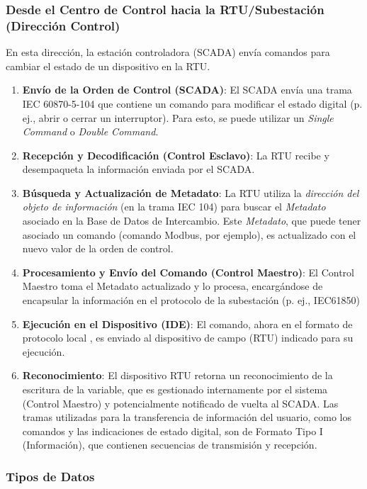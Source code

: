 \documentclass[a5paper]{book}%
\begin{document}
\subsubsection{Desde el Centro de Control hacia la RTU/Subestación (Dirección Control)}


En esta dirección, la estación controladora (SCADA) envía comandos para cambiar el estado de un dispositivo en la RTU.

\begin{enumerate}
\item \textbf{Envío de la Orden de Control (SCADA)}: El SCADA envía una trama IEC 60870-5-104 que contiene un comando para modificar el estado digital (p. ej., abrir o cerrar un interruptor). Para esto, se puede utilizar un \textit{Single Command} o \textit{Double Command}.
  
\item \textbf{Recepción y Decodificación (Control Esclavo)}: La RTU recibe y desempaqueta la información enviada por el SCADA.
  
\item \textbf {Búsqueda y Actualización de Metadato}: La RTU utiliza la \textit{dirección del objeto de información} (en la trama IEC 104) para buscar el \textit{Metadato} asociado en la Base de Datos de Intercambio. Este \textit{Metadato}, que puede tener asociado un comando (comando Modbus, por ejemplo), es actualizado con el nuevo valor de la orden de control.
  
\item \textbf {Procesamiento y Envío del Comando (Control Maestro)}: El Control Maestro toma el Metadato actualizado y lo procesa, encargándose de encapsular la información en el protocolo de la subestación (p. ej., IEC61850)
\item \textbf{Ejecución en el Dispositivo (IDE)}: El comando, ahora en el formato de protocolo local , es enviado al dispositivo de campo (RTU) indicado para su ejecución.
\item \textbf{Reconocimiento}: El dispositivo RTU retorna un reconocimiento de la escritura de la variable, que es gestionado internamente por el sistema (Control Maestro) y potencialmente notificado de vuelta al SCADA. Las tramas utilizadas para la transferencia de información del usuario, como los comandos y las indicaciones de estado digital, son de Formato Tipo I (Información), que contienen secuencias de transmisión y recepción.
\end{enumerate}


\subsubsection{Tipos de Datos}
\end{document}
